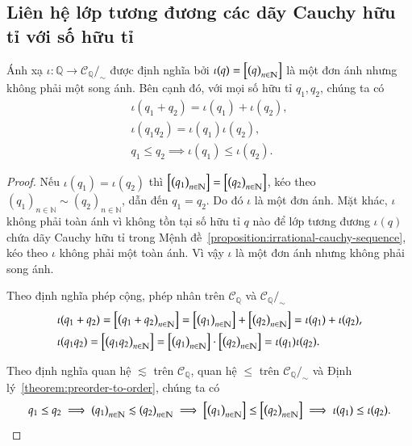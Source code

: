 \subsection{Liên hệ lớp tương đương các dãy Cauchy hữu tỉ với số hữu tỉ}

\begin{theorem}
    Ánh xạ $\iota: \mathbb{Q}\to \mathscr{C}_{\mathbb{Q}}/_{\sim}$ được định nghĩa bởi $\iota(q) = \left[{\left({q}\right)}_{{n}\in\mathbb{N}}\right]$ là một đơn ánh nhưng không phải một song ánh. Bên cạnh đó, với mọi số hữu tỉ $q_{1}, q_{2}$, chúng ta có
    \[
        \begin{split}
            \iota(q_{1} + q_{2}) = \iota(q_{1}) + \iota(q_{2}), \\
            \iota(q_{1}q_{2}) = \iota(q_{1})\iota(q_{2}), \\
            q_{1}\leq q_{2} \implies \iota(q_{1})\leq \iota(q_{2}).
        \end{split}
    \]
\end{theorem}

\begin{proof}
    Nếu $\iota(q_{1}) = \iota(q_{2})$ thì $\left[{\left({q_{1}}\right)}_{{n}\in\mathbb{N}}\right] = \left[{\left({q_{2}}\right)}_{{n}\in\mathbb{N}}\right]$, kéo theo ${(q_{1})}_{n\in\mathbb{N}}\sim {(q_{2})}_{n\in\mathbb{N}}$, dẫn đến $q_{1} = q_{2}$. Do đó $\iota$ là một đơn ánh. Mặt khác, $\iota$ không phải toàn ánh vì không tồn tại số hữu tỉ $q$ nào để lớp tương đương $\iota(q)$ chứa dãy Cauchy hữu tỉ trong Mệnh đề~\ref{proposition:irrational-cauchy-sequence}, kéo theo $\iota$ không phải một toàn ánh. Vì vậy $\iota$ là một đơn ánh nhưng không phải song ánh.

    Theo định nghĩa phép cộng, phép nhân trên $\mathscr{C}_{\mathbb{Q}}$ và $\mathscr{C}_{\mathbb{Q}}/_{\sim}$
    \begin{align*}
         & \iota(q_{1} + q_{2}) = \left[{\left({q_{1} + q_{2}}\right)}_{{n}\in\mathbb{N}}\right] = \left[{\left({q_{1}}\right)}_{{n}\in\mathbb{N}}\right] + \left[{\left({q_{2}}\right)}_{{n}\in\mathbb{N}}\right] = \iota(q_{1}) + \iota(q_{2}), \\
         & \iota(q_{1}q_{2}) = \left[{\left({q_{1}q_{2}}\right)}_{{n}\in\mathbb{N}}\right] = \left[{\left({q_{1}}\right)}_{{n}\in\mathbb{N}}\right]\cdot\left[{\left({q_{2}}\right)}_{{n}\in\mathbb{N}}\right] = \iota(q_{1})\iota(q_{2}).
    \end{align*}

    Theo định nghĩa quan hệ $\lesssim$ trên $\mathscr{C}_{\mathbb{Q}}$, quan hệ $\leq$ trên $\mathscr{C}_{\mathbb{Q}}/_{\sim}$ và Định lý~\ref{theorem:preorder-to-order}, chúng ta có
    \[
        q_{1}\leq q_{2} \implies {(q_{1})}_{n\in\mathbb{N}}\lesssim {(q_{2})}_{n\in\mathbb{N}} \implies \left[{\left({q_{1}}\right)}_{{n}\in\mathbb{N}}\right] \leq \left[{\left({q_{2}}\right)}_{{n}\in\mathbb{N}}\right] \implies \iota(q_{1}) \leq \iota(q_{2}).
    \]
\end{proof}

